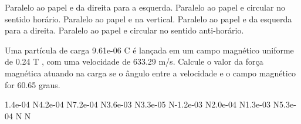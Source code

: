 \documentclass[12pt, addpoints]{exam}
\begin{document}
\begin{questions}
\begin{multicols*}{2}
\begin{choices}
\choice Paralelo ao papel e da direita para a esquerda. 
\choice Paralelo ao papel e circular no sentido horário. 
\choice Paralelo ao papel e na vertical. 
\choice Paralelo ao papel e da esquerda para a direita. 
\choice Paralelo ao papel e circular no sentido anti-horário. 
\end{choices}
\question Uma partícula de carga 9.61e-06 C é lançada em um campo magnético uniforme de    0.24 T , com uma velocidade de 633.29 m/s. Calcule o valor da força magnética atuando na carga se o ângulo entre a velocidade e o campo magnético for   60.65 graus.

\begin{oneparchoices}
\choice 1.4e-04 N\choice 4.2e-04 N\choice 7.2e-04 N\choice 3.6e-03 N\choice 3.3e-05 N\choice -1.2e-03 N\choice 2.0e-04 N\choice 1.3e-03 N\choice 5.3e-04 N N
\end{oneparchoices}\end{multicols*}
\end{questions}
\newpage
\end{document}
